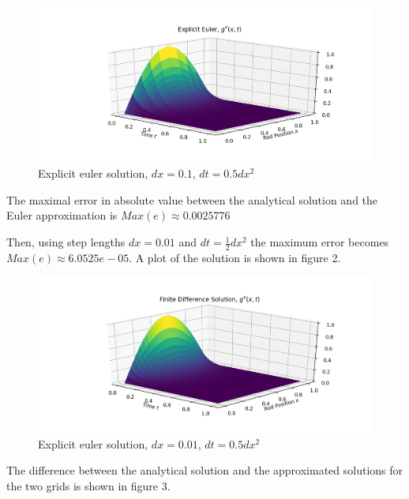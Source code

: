 \documentclass[]{article}
\begin{document}
\begin{figure}

{\centering \includegraphics[width=1\linewidth]{plots/Figure 1} 

}

\caption{Explicit euler solution, $dx=0.1$, $dt=0.5dx^2$}\label{fig:unnamed-chunk-1}
\end{figure}

The maximal error in absolute value between the analytical solution and
the Euler approximation is \(Max(e) \approx 0.0025776\)

Then, using step lengths \(dx=0.01\) and \(dt=\frac{1}{2}{dx^2}\) the
maximum error becomes \(Max(e) \approx 6.0525e-05\). A plot of the
solution is shown in figure 2.

\begin{figure}

{\centering \includegraphics[width=1\linewidth]{plots/Figure 2} 

}

\caption{Explicit euler solution, $dx=0.01$, $dt=0.5dx^2$}\label{fig:unnamed-chunk-2}
\end{figure}

The difference between the analytical solution and the approximated
solutions for the two grids is shown in figure 3.
\end{document}
